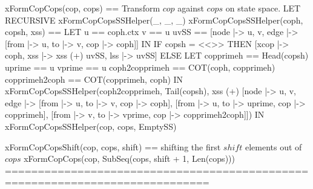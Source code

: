 \documentclass{article}
\begin{document}
\begin{tla}
xFormCopCops(cop, cops) == \* Transform $cop$ against $cops$ on state space.
    LET RECURSIVE xFormCopCopsSSHelper(_, _, _) 
        xFormCopCopsSSHelper(coph, copsh, xss) == 
            LET u == coph.ctx
                v == u 
             uvSS == [node |-> {u, v}, 
                      edge |-> {[from |-> u, to |-> v, cop |-> coph]}]
             IN IF copsh = <<>> THEN [xcop |-> coph, 
                                       xss |-> xss (+) uvSS, lss |-> uvSS]
                ELSE LET copprimeh == Head(copsh)
                            uprime == u 
                            vprime == u 
                         coph2copprimeh == COT(coph, copprimeh)
                         copprimeh2coph == COT(copprimeh, coph)
                      IN xFormCopCopsSSHelper(coph2copprimeh, 
                            Tail(copsh),
                            xss (+) [node |-> {u, v}, 
                                     edge |-> {[from |-> u, to |-> v, cop |-> coph],
                                               [from |-> u, to |-> uprime, 
                                                 cop |-> copprimeh],
                                               [from |-> v, to |-> vprime, 
                                                 cop |-> copprimeh2coph]}])
    IN  xFormCopCopsSSHelper(cop, cops, EmptySS)

xFormCopCopsShift(cop, cops, shift) == 
                    \* shifting the first $shift$ elements out of $cops$
    xFormCopCops(cop, SubSeq(cops, shift + 1, Len(cops)))
=============================================================================
\end{tla}
\end{document}
